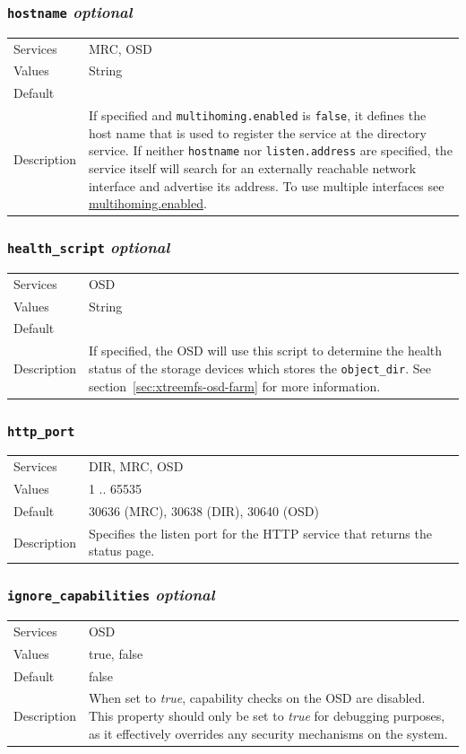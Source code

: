 \documentclass[a4paper,10pt]{book}
\begin{document}
\subsubsection{\texttt{hostname} \textit{optional}}
\label{options:hostname}
\begin{tabular}{lp{10cm}}
 Services & MRC, OSD\\
 Values   & String \\
 Default  & \\
 Description & If specified and \texttt{multihoming.enabled} is \texttt{false}, it defines the host name that is used to register the service at the directory service. If neither \texttt{hostname} nor \texttt{listen.address} are specified, the service itself will search for an externally reachable network interface and advertise its address. To use multiple interfaces see \hyperref[option:multihoming.enabled]{multihoming.enabled}.
\end{tabular}

\subsubsection{\texttt{health\_script} \textit{optional}}
\begin{tabular}{lp{10cm}}
 Services & OSD\\
 Values   & String \\
 Default  & \\
 Description & If specified, the OSD will use this script to determine the health status of the storage devices which stores the \texttt{object\_dir}. See section~\ref{sec:xtreemfs-osd-farm} for more information.
\end{tabular}
\subsubsection{\texttt{http\_port}}
\begin{tabular}{lp{10cm}}
 Services & DIR, MRC, OSD\\
 Values   & 1 .. 65535 \\
 Default  & 30636 (MRC), 30638 (DIR), 30640 (OSD)\\
 Description & Specifies the listen port for the HTTP service that returns the status page.
\end{tabular}

\subsubsection{\texttt{ignore\_capabilities} \textit{optional}}
\begin{tabular}{lp{10cm}}
 Services & OSD\\
 Values   & true, false \\
 Default  & false\\
 Description & When set to \textit{true}, capability checks on the OSD are disabled. This property should only be set to \textit{true} for debugging purposes, as it effectively overrides any security mechanisms on the system.
\end{tabular}
\end{document}

